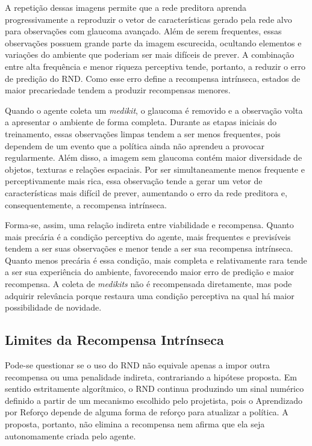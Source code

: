 A repetição dessas imagens permite que a rede preditora aprenda progressivamente a reproduzir o vetor de características gerado pela rede alvo para observações com glaucoma avançado. Além de serem frequentes, essas observações possuem grande parte da imagem escurecida, ocultando elementos e variações do ambiente que poderiam ser mais difíceis de prever. A combinação entre alta frequência e menor riqueza perceptiva tende, portanto, a reduzir o erro de predição do RND. Como esse erro define a recompensa intrínseca, estados de maior precariedade tendem a produzir recompensas menores.

Quando o agente coleta um \textit{medikit}, o glaucoma é removido e a observação volta a apresentar o ambiente de forma completa. Durante as etapas iniciais do treinamento, essas observações limpas tendem a ser menos frequentes, pois dependem de um evento que a política ainda não aprendeu a provocar regularmente. Além disso, a imagem sem glaucoma contém maior diversidade de objetos, texturas e relações espaciais. Por ser simultaneamente menos frequente e perceptivamente mais rica, essa observação tende a gerar um vetor de características mais difícil de prever, aumentando o erro da rede preditora e, consequentemente, a recompensa intrínseca.

Forma-se, assim, uma relação indireta entre viabilidade e recompensa. Quanto mais precária é a condição perceptiva do agente, mais frequentes e previsíveis tendem a ser suas observações e menor tende a ser sua recompensa intrínseca. Quanto menos precária é essa condição, mais completa e relativamente rara tende a ser sua experiência do ambiente, favorecendo maior erro de predição e maior recompensa. A coleta de \textit{medikits} não é recompensada diretamente, mas pode adquirir relevância porque restaura uma condição perceptiva na qual há maior possibilidade de novidade.

\subsection{Limites da Recompensa Intrínseca}

Pode-se questionar se o uso do RND não equivale apenas a impor outra recompensa ou uma penalidade indireta, contrariando a hipótese proposta. Em sentido estritamente algorítmico, o RND continua produzindo um sinal numérico definido a partir de um mecanismo escolhido pelo projetista, pois o Aprendizado por Reforço depende de alguma forma de reforço para atualizar a política. A proposta, portanto, não elimina a recompensa nem afirma que ela seja autonomamente criada pelo agente.

